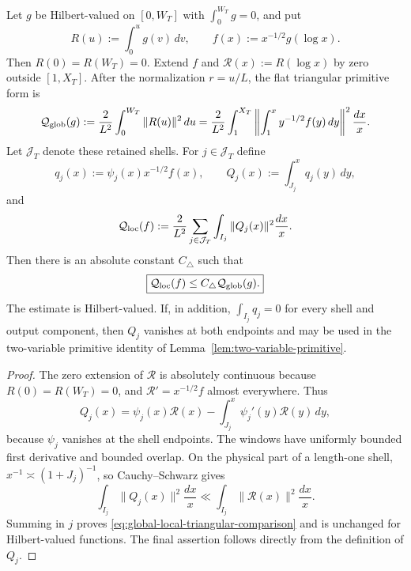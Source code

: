 \begin{lemma}
\label{lem:global-local-triangular}
Let $g$ be Hilbert-valued on $[0,W_T]$ with $\int_0^{W_T}g=0$, and put
\[
R(u):=\int_0^u g(v)\,dv,
\qquad f(x):=x^{-1/2}g(\log x).
\]
Then $R(0)=R(W_T)=0$. Extend $f$ and
$\mathcal R(x):=R(\log x)$ by zero outside $[1,X_T]$. After the normalization
$r=u/L$, the flat triangular primitive form is
\begin{equation}
\mathcal Q_{\rm glob}(g)
:=\frac{2}{L^2}\int_0^{W_T}\|R(u)\|^2\,du
=\frac{2}{L^2}\int_1^{X_T}
\left\|\int_1^x y^{-1/2}f(y)\,dy\right\|^2\frac{dx}{x}.
\label{eq:global-triangular-log}
\end{equation}
Let $\mathcal J_T$ denote these retained shells. For $j\in\mathcal J_T$ define
\[
q_j(x):=\psi_j(x)x^{-1/2}f(x),
\qquad
Q_j(x):=\int_{J_j}^xq_j(y)\,dy,
\]
and
\begin{equation}
\mathcal Q_{\rm loc}(f)
:=\frac{2}{L^2}\sum_{j\in\mathcal J_T}
\int_{I_j}\|Q_j(x)\|^2\frac{dx}{x}.
\label{eq:local-triangular-shell}
\end{equation}
Then there is an absolute constant $C_\triangle$ such that
\begin{equation}
\boxed{\mathcal Q_{\rm loc}(f)\le
C_\triangle\mathcal Q_{\rm glob}(g).}
\label{eq:global-local-triangular-comparison}
\end{equation}
The estimate is Hilbert-valued. If, in addition,
$\int_{I_j}q_j=0$ for every shell and output component, then $Q_j$ vanishes at both
endpoints and may be used in the two-variable primitive identity of
Lemma~\ref{lem:two-variable-primitive}.
\end{lemma}

\begin{proof}
The zero extension of $\mathcal R$ is absolutely continuous because
$R(0)=R(W_T)=0$, and $\mathcal R'=x^{-1/2}f$ almost everywhere. Thus
\[
Q_j(x)=\psi_j(x)\mathcal R(x)
-\int_{J_j}^x\psi_j'(y)\mathcal R(y)\,dy,
\]
because $\psi_j$ vanishes at the shell endpoints. The windows have uniformly
bounded first derivative and bounded overlap. On the physical part of a
length-one shell, $x^{-1}\asymp(1+J_j)^{-1}$, so Cauchy--Schwarz gives
\[
\int_{I_j}\|Q_j(x)\|^2\frac{dx}{x}
\ll\int_{I_j}\|\mathcal R(x)\|^2\frac{dx}{x}.
\]
Summing in $j$ proves \eqref{eq:global-local-triangular-comparison} and is
unchanged for Hilbert-valued functions. The final assertion follows directly
from the definition of $Q_j$.
\end{proof}

